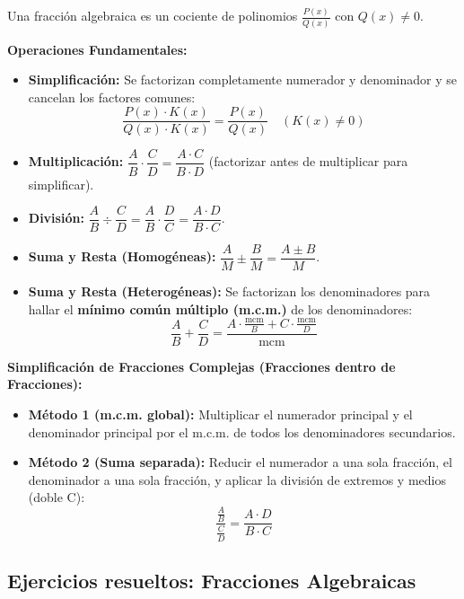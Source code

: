 \documentclass[12pt, letterpaper]{article}
\begin{document}
Una fracción algebraica es un cociente de polinomios $\frac{P(x)}{Q(x)}$ con $Q(x) \neq 0$.

\begin{cuadroteoria}
      \textbf{Operaciones Fundamentales:}
      \begin{itemize}[leftmargin=*]
            \item \textbf{Simplificación:} Se factorizan completamente numerador y denominador y se cancelan los factores comunes:
                  $$\frac{P(x) \cdot K(x)}{Q(x) \cdot K(x)} = \frac{P(x)}{Q(x)} \quad (K(x) \neq 0)$$
            \item \textbf{Multiplicación:} $\dfrac{A}{B} \cdot \dfrac{C}{D} = \dfrac{A \cdot C}{B \cdot D}$ \quad (factorizar antes de multiplicar para simplificar).
            \item \textbf{División:} $\dfrac{A}{B} \div \dfrac{C}{D} = \dfrac{A}{B} \cdot \dfrac{D}{C} = \dfrac{A \cdot D}{B \cdot C}$.
            \item \textbf{Suma y Resta (Homogéneas):} $\dfrac{A}{M} \pm \dfrac{B}{M} = \dfrac{A \pm B}{M}$.
            \item \textbf{Suma y Resta (Heterogéneas):} Se factorizan los denominadores para hallar el \textbf{mínimo común múltiplo (m.c.m.)} de los denominadores:
                  $$\frac{A}{B} + \frac{C}{D} = \frac{A \cdot \frac{\text{mcm}}{B} + C \cdot \frac{\text{mcm}}{D}}{\text{mcm}}$$
      \end{itemize}
\end{cuadroteoria}

\begin{cuadropasos}
      \textbf{Simplificación de Fracciones Complejas (Fracciones dentro de Fracciones):}
      \begin{itemize}[leftmargin=*]
            \item \textbf{Método 1 (m.c.m. global):} Multiplicar el numerador principal y el denominador principal por el m.c.m. de todos los denominadores secundarios.
            \item \textbf{Método 2 (Suma separada):} Reducir el numerador a una sola fracción, el denominador a una sola fracción, y aplicar la división de extremos y medios (doble C):
                  $$\frac{\frac{A}{B}}{\frac{C}{D}} = \frac{A \cdot D}{B \cdot C}$$
      \end{itemize}
\end{cuadropasos}

\subsection{Ejercicios resueltos: Fracciones Algebraicas}
\end{document}
